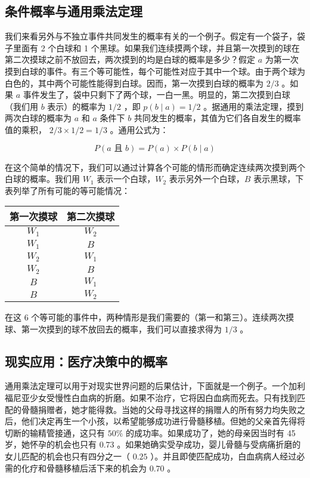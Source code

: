 \subsection{条件概率与通用乘法定理}

我们来看另外与不独立事件共同发生的概率有关的一个例子。假定有一个袋子，袋子里面有 2 个白球和 1 个黑球。如果我们连续摸两个球，并且第一次摸到的球在第二次摸球之前不放回去，两次摸到的均是白球的概率是多少？假定 $a$ 为第一次摸到白球的事件。有三个等可能性，每个可能性对应于其中一个球。由于两个球为白色的，其中两个可能性能得到白球。因而，第一次摸到白球的概率为 $2 / 3$ 。如果 $a$ 事件发生了，袋中只剩下了两个球，一白一黑。明显的，第二次摸到白球（我们用 $b$ 表示）的概率为 $1 / 2$ ，即 $p(b \mid a)=1 / 2$ 。据通用的乘法定理，摸到两次白球的概率为 $a$ 和 $a$ 条件下 $b$ 共同发生的概率，其值为它们各自发生的概率值的乘积， $2 / 3 \times 1 / 2=1 / 3$ 。通用公式为：

$$
P(a \text { 且 } b)=P(a) \times P(b \mid a)
$$

在这个简单的情况下，我们可以通过计算各个可能的情形而确定连续两次摸到两个白球的概率。我们用 $W_{1}$ 表示一个白球，$W_{2}$ 表示另外一个白球，$B$ 表示黑球，下表列举了所有可能的等可能情况：

\begin{center}
\begin{tabular}{|c|c|}
\hline
\textbf{第一次摸球} & \textbf{第二次摸球} \\
\hline
$W_{1}$ & $W_{2}$ \\
$W_{1}$ & $B$ \\
$W_{2}$ & $W_{1}$ \\
$W_{2}$ & $B$ \\
$B$ & $W_{1}$ \\
$B$ & $W_{2}$ \\
\hline
\end{tabular}
\end{center}

在这 6 个等可能的事件中，两种情形是我们需要的（第一和第三）。连续两次摸球、第一次摸到的球不放回去的概率，我们可以直接求得为 $1 / 3$ 。

\subsection{现实应用：医疗决策中的概率}

通用乘法定理可以用于对现实世界问题的后果估计，下面就是一个例子。一个加利福尼亚少女受慢性白血病的折磨。如果不治疗，它将因白血病而死去。只有找到匹配的骨髓捐赠者，她才能得救。当她的父母寻找这样的捐赠人的所有努力均失败之后，他们决定再生一个小孩，以希望能够成功进行骨髓移植。但她的父亲首先得将切断的输精管接通，这只有 $50\%$ 的成功率。如果成功了，她的母亲因当时有 45 岁，她怀孕的机会也只有 $0.73$ 。如果她确实受孕成功，婴儿骨髓与受病痛折磨的女儿匹配的机会也只有四分之一（ $0.25$ ）。并且即使匹配成功，白血病病人经过必需的化疗和骨髓移植后活下来的机会为 $0.70$ 。

